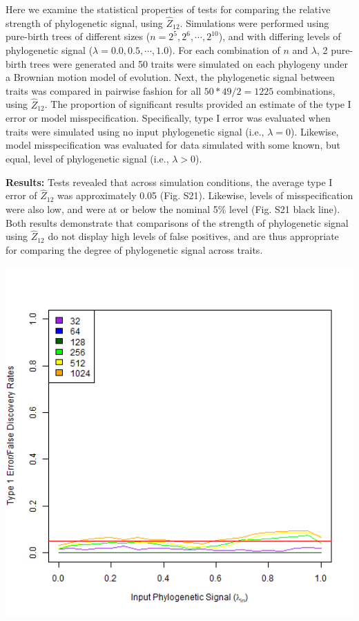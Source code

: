 \documentclass[
]{article}
\begin{document}
Here we examine the statistical properties of tests for comparing the
relative strength of phylogenetic signal, using \(\hat{Z}_{12}\).
Simulations were performed using pure-birth trees of different sizes
(\(n=2^5, 2^6, \cdots, 2^{10}\)), and with differing levels of
phylogenetic signal (\(\lambda=0.0, 0.5, \cdots, 1.0\)). For each
combination of \(n\) and \(\lambda\), 2 pure-birth trees were generated
and 50 traits were simulated on each phylogeny under a Brownian motion
model of evolution. Next, the phylogenetic signal between traits was
compared in pairwise fashion for all \(50*49/2 = 1225\) combinations,
using \(\hat{Z}_{12}\). The proportion of significant results provided
an estimate of the type I error or model misspecification. Specifically,
type I error was evaluated when traits were simulated using no input
phylogenetic signal (i.e., \(\lambda = 0\)). Likewise, model
misspecification was evaluated for data simulated with some known, but
equal, level of phylogenetic signal (i.e., \(\lambda > 0\)).
\hfill\break

\textbf{Results:} Tests revealed that across simulation conditions, the
average type I error of \(\hat{Z}_{12}\) was approximately 0.05 (Fig.
S21). Likewise, levels of misspecification were also low, and were at or
below the nominal 5\% level (Fig. S21 black line). Both results
demonstrate that comparisons of the strength of phylogenetic signal
using \(\hat{Z}_{12}\) do not display high levels of false positives,
and are thus appropriate for comparing the degree of phylogenetic signal
across traits.

\includegraphics[width=6.67in,height=0.5\textheight]{fig.S21}
\end{document}

